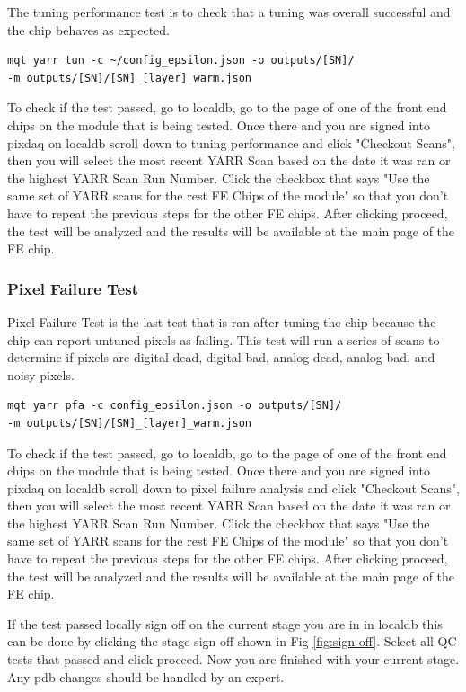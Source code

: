 \documentclass[12pt]{article}
\begin{document}
The tuning performance test is to check that a tuning was overall successful and the chip behaves as expected.

\begin{verbatim}
mqt yarr tun -c ~/config_epsilon.json -o outputs/[SN]/
-m outputs/[SN]/[SN]_[layer]_warm.json 
\end{verbatim}

To check if the test passed, go to localdb, go to the page of one of the front end chips on the module that is being tested. Once there and you are signed into pixdaq on localdb scroll down to tuning performance and click "Checkout Scans", then you will select the most recent YARR Scan based on the date it was ran or the highest YARR Scan Run Number. Click the checkbox that says "Use the same set of YARR scans for the rest FE Chips of the module" so that you don't have to repeat the previous steps for the other FE chips. After clicking proceed, the test will be analyzed and the results will be available at the main page of the FE chip. 

\subsubsection{Pixel Failure Test}

Pixel Failure Test is the last test that is ran after tuning the chip because the chip can report untuned pixels as failing. This test will run a series of scans to determine if pixels are digital dead, digital bad, analog dead, analog bad, and noisy pixels.

\begin{verbatim}
mqt yarr pfa -c config_epsilon.json -o outputs/[SN]/
-m outputs/[SN]/[SN]_[layer]_warm.json  
\end{verbatim}

To check if the test passed, go to localdb, go to the page of one of the front end chips on the module that is being tested. Once there and you are signed into pixdaq on localdb scroll down to pixel failure analysis and click "Checkout Scans", then you will select the most recent YARR Scan based on the date it was ran or the highest YARR Scan Run Number. Click the checkbox that says "Use the same set of YARR scans for the rest FE Chips of the module" so that you don't have to repeat the previous steps for the other FE chips. After clicking proceed, the test will be analyzed and the results will be available at the main page of the FE chip. 

If the test passed locally sign off on the current stage you are in in localdb this can be done by clicking the stage sign off shown in Fig \ref{fig:sign-off}. Select all QC tests that passed and click proceed. Now you are finished with your current stage. Any pdb changes should be handled by an expert. 
\end{document}
